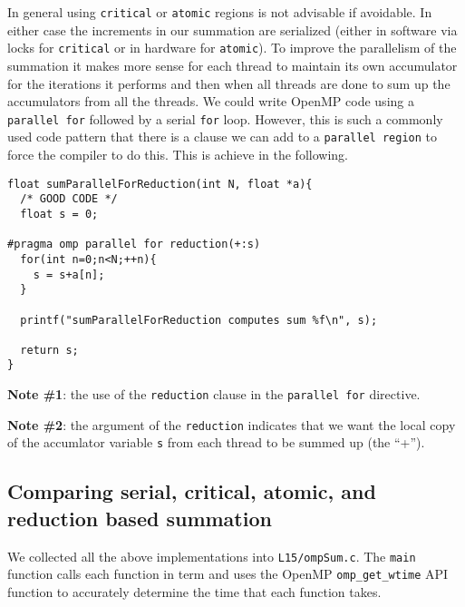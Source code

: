 In general using \texttt{critical} or \texttt{atomic} regions is not advisable if avoidable. In either case the increments in our summation are serialized (either in software via locks for \texttt{critical} or in hardware for \texttt{atomic}). To improve the parallelism of the summation it makes more sense for each thread to maintain its own accumulator for the iterations it performs and then when all threads are done to sum up the accumulators from all the threads. We could write OpenMP code using a \texttt{parallel for} followed by a serial \texttt{for} loop. However, this is such a commonly used code pattern that there is a clause we can add to a \texttt{parallel region} to force the compiler to do this. This is achieve in the following.

\begin{verbatim}
float sumParallelForReduction(int N, float *a){
  /* GOOD CODE */
  float s = 0;

#pragma omp parallel for reduction(+:s)
  for(int n=0;n<N;++n){
    s = s+a[n];
  }

  printf("sumParallelForReduction computes sum %f\n", s);

  return s;
}
\end{verbatim}

{\bf Note \#1}: the use of the \texttt{reduction} clause in the \texttt{parallel for} directive.

{\bf Note \#2}: the argument of the \texttt{reduction} indicates that we want the local copy of the accumlator variable \texttt{s} from each thread to be summed up (the ``+'').

\subsection{Comparing serial, critical, atomic, and reduction based summation}

We collected all the above implementations into \texttt{L15/ompSum.c}. The \texttt{main} function calls each function in term and uses the OpenMP \texttt{omp\_get\_wtime} API function to accurately determine the time that each function takes.

